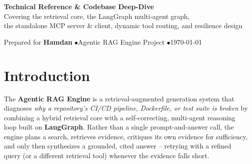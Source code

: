 \documentclass[11pt,a4paper]{article}
\begin{document}
\begin{titlepage}
\vspace*{10.6cm}
\begin{center}
{\sffamily\Large\color{navy}\textbf{Technical Reference \& Codebase Deep-Dive}}\\[6pt]
{\sffamily\color{softgray}Covering the retrieval core, the LangGraph multi-agent graph,\\
the standalone MCP server \& client, dynamic tool routing, and resilience design}
\end{center}

\vfill
\begin{center}
\end{center}

\vspace{1.2cm}
\begin{center}
{\sffamily\small\color{softgray} Prepared for \textbf{\color{navy}Hamdan} \quad$\bullet$\quad Agentic RAG Engine Project \quad$\bullet$\quad \today}
\end{center}
\restoregeometry
\end{titlepage}

\clearpage
{}
\tableofcontents
\clearpage
{}



\section{Introduction}
\label{sec:intro}

The \textbf{Agentic RAG Engine} is a retrieval-augmented generation system that
diagnoses \emph{why a repository's CI/CD pipeline, Dockerfile, or test suite is
broken} by combining a hybrid retrieval core with a self-correcting,
multi-agent reasoning loop built on \textbf{LangGraph}. Rather than a single
prompt-and-answer call, the engine plans a search, retrieves evidence,
critiques its own evidence for sufficiency, and only then synthesizes a
grounded, cited answer -- retrying with a refined query (or a different
retrieval tool) whenever the evidence falls short.
\end{document}
